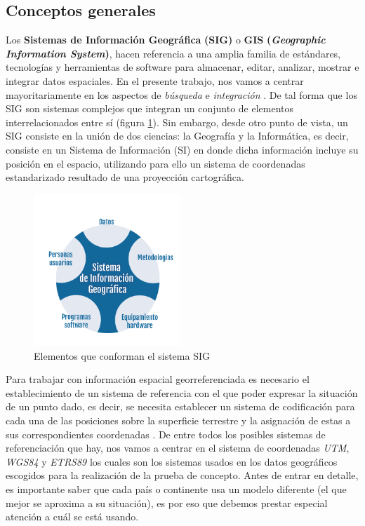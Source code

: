 

\subsection{Conceptos generales}

Los \textbf{Sistemas de Información Geográfica} \textbf{(SIG)} o \textbf{GIS} \textbf{(\textit{Geographic Information System})}, hacen referencia a una amplia familia de estándares, tecnologías y herramientas de software para almacenar, editar, analizar, mostrar e integrar datos espaciales. En el presente trabajo, nos vamos a centrar mayoritariamente en los aspectos de \textit{búsqueda} e \textit{integración} \cite{tesis}. De tal forma que los SIG son sistemas complejos que integran un conjunto de elementos interrelacionados entre sí \cite{VictorOlaya} (figura \ref{fig:elementosSIG}). Sin embargo, desde otro punto de vista, un SIG consiste en la unión de dos ciencias: la Geografía y la Informática, es decir, consiste en un Sistema de Información (SI) en donde dicha información incluye su posición en el espacio, utilizando para ello un sistema de coordenadas estandarizado resultado de una proyección cartográfica. 

\begin{figure}[H]
	\centering
	\includegraphics[width=0.49\textwidth]{imagenes/capitulo2/graficoSig}
	\caption{Elementos que conforman el sistema SIG \cite{image-capitulo2}}
	\label{fig:elementosSIG}
\end{figure}

Para trabajar con información espacial georreferenciada es necesario el establecimiento de un sistema de referencia con el que poder expresar la situación de un punto dado, es decir, se necesita establecer un sistema de codificación para cada una de las posiciones sobre la superficie terrestre y la asignación de estas a sus correspondientes coordenadas \cite{VictorOlaya}. De entre todos los posibles sistemas de referenciación que hay, nos vamos a centrar en el sistema de coordenadas \textit{UTM}, \textit{WGS84} y \textit{ETRS89}  los cuales son los sistemas usados en los datos geográficos escogidos para la realización de la prueba de concepto. Antes de entrar en detalle, es importante saber que cada país o continente usa un modelo diferente (el que mejor se aproxima a su situación), es por eso que debemos prestar especial atención a cuál se está usando. 

